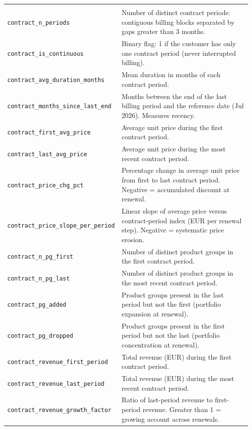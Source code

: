 \documentclass{article}
\begin{document}
\begin{longtable}{@{}p{5.4cm} p{10.6cm}@{}}
\rowcolor{gray!20} \multicolumn{2}{@{}l}{\textit{Inferred contract dynamics}} \\
\texttt{contract\_\allowbreak n\_\allowbreak periods} & Number of distinct contract periods: contiguous billing blocks separated by gaps greater than 3 months. \\
\texttt{contract\_\allowbreak is\_\allowbreak continuous} & Binary flag: 1 if the customer has only one contract period (never interrupted billing). \\
\texttt{contract\_\allowbreak avg\_\allowbreak duration\_\allowbreak months} & Mean duration in months of each contract period. \\
\texttt{contract\_\allowbreak months\_\allowbreak since\_\allowbreak last\_\allowbreak end} & Months between the end of the last billing period and the reference date (Jul 2026). Measures recency. \\
\texttt{contract\_\allowbreak first\_\allowbreak avg\_\allowbreak price} & Average unit price during the first contract period. \\
\texttt{contract\_\allowbreak last\_\allowbreak avg\_\allowbreak price} & Average unit price during the most recent contract period. \\
\texttt{contract\_\allowbreak price\_\allowbreak chg\_\allowbreak pct} & Percentage change in average unit price from first to last contract period. Negative = accumulated discount at renewal. \\
\texttt{contract\_\allowbreak price\_\allowbreak slope\_\allowbreak per\_\allowbreak period} & Linear slope of average price versus contract-period index (EUR per renewal step). Negative = systematic price erosion. \\
\texttt{contract\_\allowbreak n\_\allowbreak pg\_\allowbreak first} & Number of distinct product groups in the first contract period. \\
\texttt{contract\_\allowbreak n\_\allowbreak pg\_\allowbreak last} & Number of distinct product groups in the most recent contract period. \\
\texttt{contract\_\allowbreak pg\_\allowbreak added} & Product groups present in the last period but not the first (portfolio expansion at renewal). \\
\texttt{contract\_\allowbreak pg\_\allowbreak dropped} & Product groups present in the first period but not the last (portfolio concentration at renewal). \\
\texttt{contract\_\allowbreak revenue\_\allowbreak first\_\allowbreak period} & Total revenue (EUR) during the first contract period. \\
\texttt{contract\_\allowbreak revenue\_\allowbreak last\_\allowbreak period} & Total revenue (EUR) during the most recent contract period. \\
\texttt{contract\_\allowbreak revenue\_\allowbreak growth\_\allowbreak factor} & Ratio of last-period revenue to first-period revenue. Greater than 1 = growing account across renewals. \\


\end{longtable}
\end{document}
